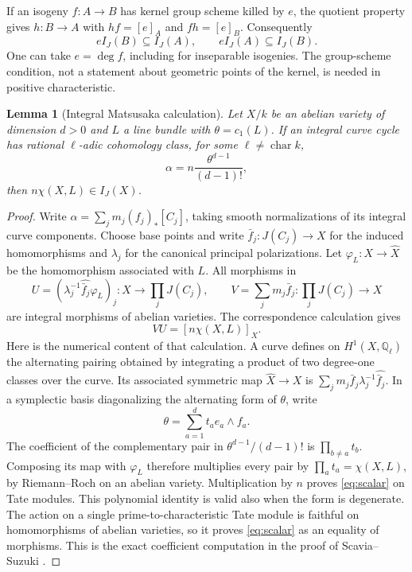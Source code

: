 \documentclass[11pt]{article}
\newcommand{\Q}{\mathbb Q}
\newtheorem{lemma}[theorem]{Lemma}
\theoremstyle{definition}
\theoremstyle{remark}
\begin{document}
If an isogeny $f:A\to B$ has kernel group scheme killed by $e$, the quotient property gives $h:B\to A$ with $hf=[e]_A$ and $fh=[e]_B$. Consequently
\begin{equation}\label{eq:isogeny}
 eI_J(B)\subseteq I_J(A),\qquad eI_J(A)\subseteq I_J(B).
\end{equation}
One can take $e=\deg f$, including for inseparable isogenies. The group-scheme condition, not a statement about geometric points of the kernel, is needed in positive characteristic.

\begin{lemma}[Integral Matsusaka calculation]\label{lem:scalar}
Let $X/k$ be an abelian variety of dimension $d>0$ and $L$ a line bundle with $\theta=c_1(L)$. If an integral curve cycle has rational $\ell$-adic cohomology class, for some $\ell\ne\operatorname{char}k$,
\[
                    \alpha=n\frac{\theta^{d-1}}{(d-1)!},
\]
then $n\chi(X,L)\in I_J(X)$.
\end{lemma}
\begin{proof}
Write $\alpha=\sum_jm_j(f_j)_*[C_j]$, taking smooth normalizations of its integral curve components. Choose base points and write $\bar f_j:J(C_j)\to X$ for the induced homomorphisms and $\lambda_j$ for the canonical principal polarizations. Let $\varphi_L:X\to\widehat X$ be the homomorphism associated with $L$. All morphisms in
\[
 U=(\lambda_j^{-1}\widehat{\bar f_j}\varphi_L)_j:X\to\prod_jJ(C_j),
 \qquad V=\sum_jm_j\bar f_j:\prod_jJ(C_j)\to X
\]
are integral morphisms of abelian varieties. The correspondence calculation gives
\begin{equation}\label{eq:scalar}
                         VU=[n\chi(X,L)]_X.
\end{equation}
Here is the numerical content of that calculation. A curve defines on $H^1(X,\Q_\ell)$ the alternating pairing obtained by integrating a product of two degree-one classes over the curve. Its associated symmetric map $\widehat X\to X$ is $\sum_jm_j\bar f_j\lambda_j^{-1}\widehat{\bar f_j}$. In a symplectic basis diagonalizing the alternating form of $\theta$, write
\[
             \theta=\sum_{a=1}^d t_a e_a\wedge f_a.
\]
The coefficient of the complementary pair in $\theta^{d-1}/(d-1)!$ is $\prod_{b\ne a}t_b$. Composing its map with $\varphi_L$ therefore multiplies every pair by $\prod_at_a=\chi(X,L)$, by Riemann--Roch on an abelian variety. Multiplication by $n$ proves \eqref{eq:scalar} on Tate modules. This polynomial identity is valid also when the form is degenerate. The action on a single prime-to-characteristic Tate module is faithful on homomorphisms of abelian varieties, so it proves \eqref{eq:scalar} as an equality of morphisms. This is the exact coefficient computation in the proof of Scavia--Suzuki \cite[Proposition~3.4, equations~(3.1)--(3.3)]{ScaviaSuzuki}.
\end{proof}
\end{document}
